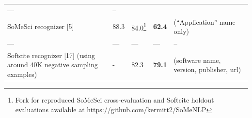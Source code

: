 \documentclass[
]{article}
\begin{document}
\begin{longtable}[]{@{}lllll@{}}
\begin{minipage}[t]{0.18\columnwidth}
---\strut
\end{minipage} & \begin{minipage}[t]{0.12\columnwidth}\raggedright
--\strut
\end{minipage}\tabularnewline
\begin{minipage}[t]{0.18\columnwidth}\raggedright
SoMeSci recognizer {[}5{]}\strut
\end{minipage} & \begin{minipage}[t]{0.18\columnwidth}\raggedright
88.3\strut
\end{minipage} & \begin{minipage}[t]{0.18\columnwidth}\raggedright
84.0\footnote{Fork for reproduced SoMeSci cross-evaluation and Softcite
  holdout evaluations available at https://github.com/kermitt2/SoMeNLP}\strut
\end{minipage} & \begin{minipage}[t]{0.18\columnwidth}\raggedright
\textbf{62.4}\strut
\end{minipage} & \begin{minipage}[t]{0.12\columnwidth}\raggedright
(``Application'' name only)\strut
\end{minipage}\tabularnewline
\begin{minipage}[t]{0.18\columnwidth}\raggedright
---\strut
\end{minipage} & \begin{minipage}[t]{0.18\columnwidth}\raggedright
---\strut
\end{minipage} & \begin{minipage}[t]{0.18\columnwidth}\raggedright
---\strut
\end{minipage} & \begin{minipage}[t]{0.18\columnwidth}\raggedright
---\strut
\end{minipage} & \begin{minipage}[t]{0.12\columnwidth}\raggedright
--\strut
\end{minipage}\tabularnewline
\begin{minipage}[t]{0.18\columnwidth}\raggedright
Softcite recognizer {[}17{]} (using around 40K negative sampling
examples)\strut
\end{minipage} & \begin{minipage}[t]{0.18\columnwidth}\raggedright
-\strut
\end{minipage} & \begin{minipage}[t]{0.18\columnwidth}\raggedright
82.3\strut
\end{minipage} & \begin{minipage}[t]{0.18\columnwidth}\raggedright
\textbf{79.1}\strut
\end{minipage} & \begin{minipage}[t]{0.12\columnwidth}\raggedright
(software name, version, publisher, url)\strut
\end{minipage}\tabularnewline
\bottomrule
\end{longtable}
\end{document}
